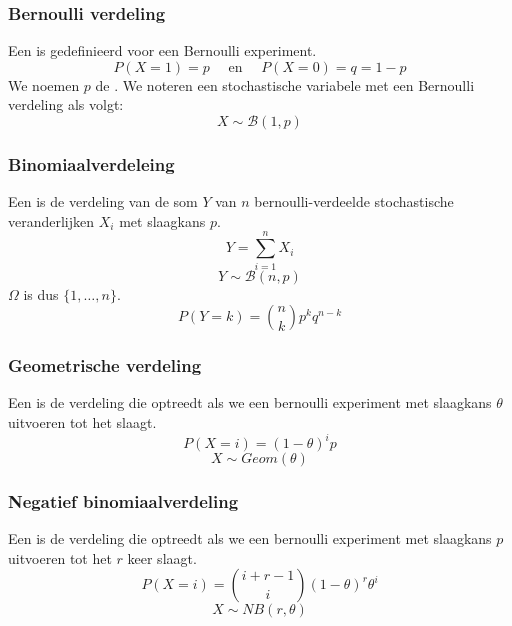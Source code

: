 \documentclass[main.tex]{subfiles}
\begin{document}
\subsubsection{Bernoulli verdeling}
\label{sec:bernoulli-verdeling}

\begin{de}
  Een  is gedefinieerd voor een Bernoulli experiment.
  \[ P(X=1) = p \quad\text{ en }\quad P(X=0) = q = 1-p \]
  We noemen $p$ de .
  We noteren een stochastische variabele met een Bernoulli verdeling als volgt:
  \[ X \sim \mathcal{B}(1,p) \]
\end{de}


\subsubsection{Binomiaalverdeleing}
\label{sec:binomiaalverdeleing}

\begin{de}
  Een  is de verdeling van de som $Y$ van $n$ bernoulli-verdeelde stochastische veranderlijken $X_{i}$ met slaagkans $p$.
  \[ Y = \sum_{i=1}^{n}X_{i}\]
  \[ Y \sim \mathcal{B}(n,p) \]
  $\Omega$ is dus $\{1,\dotsc,n\}$.
  \[ P(Y=k) = \binom{n}{k}p^{k}q^{n-k} \]
\end{de}

\subsubsection{Geometrische verdeling}
\label{sec:geom-verd}

\begin{de}
  Een  is de verdeling die optreedt als we een bernoulli experiment met slaagkans $\theta$ uitvoeren tot het slaagt.
  \[ P(X=i) = (1-\theta)^{i}p \]
  \[ X \sim Geom(\theta) \]
\end{de}


\subsubsection{Negatief binomiaalverdeling}
\label{sec:negat-binom}

\begin{de}
  Een  is de verdeling die optreedt als we een bernoulli experiment met slaagkans $p$ uitvoeren tot het $r$ keer slaagt.
  \[ P(X=i) = \binom{i+r-1}{i}(1-\theta)^{r}\theta^{i} \]
  \[ X \sim NB(r,\theta) \]
\end{de}
\end{document}
